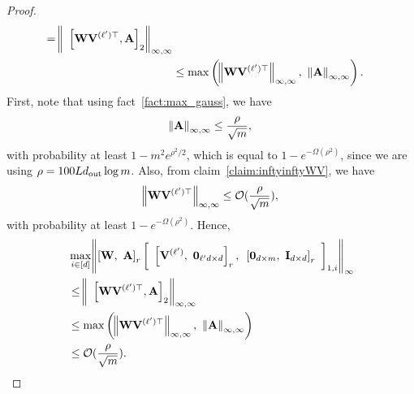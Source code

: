 \begin{proof}
\begin{align*}
		= \norm{\text{ }\left[\mathbf{W}\mathbf{V}^{(\ell')\top},  \mathbf{A}\right]_{2}}_{\infty, \infty}  \\&
		\le \max\left(\norm{\mathbf{W}\mathbf{V}^{(\ell')\top}}_{\infty, \infty}, \text{ } \norm{\mathbf{A}}_{\infty, \infty}\right).
	\end{align*}
	First, note that using fact~\ref{fact:max_gauss}, we have
	\begin{align*}
		\norm{\mathbf{A}}_{\infty, \infty} \le \frac{\rho}{\sqrt{m}},
	\end{align*}
	with probability at least $1 - m^2e^{\rho^2/2}$, which is equal to $1 - e^{-\Omega(\rho^2)}$, since we are using $\rho = 100Ld_{\mathrm{out}} \log m$. Also, from claim~\ref{claim:inftyinftyWV}, we have
	\begin{align*}
		\norm{\mathbf{W}\mathbf{V}^{(\ell')\top}}_{\infty, \infty} \le \mathcal{O}(\frac{\rho}{\sqrt{m}}),
	\end{align*}
	with probability at least $1 - e^{-\Omega(\rho^2)}$.
	Hence, 
	\begin{align*}
		&\max_{i \in [d]} \norm{\left[\mathbf{W}, \text{ } \mathbf{A}\right]_r \left[\text{ }\left[\mathbf{V}^{(\ell')}, \text{ } \mathbf{0}_{\ell'd \times d}\right]_r,\text{ } \left[\mathbf{0}_{d \times m},\text{ } \mathbf{I}_{d \times d}\right]_r\text{ }\right]_{1, i}}_{\infty}\\&
		\le \norm{\text{ }\left[\mathbf{W}\mathbf{V}^{(\ell')\top},  \mathbf{A}\right]_{2}}_{\infty, \infty}  \\&
		\le \max\left(\norm{\mathbf{W}\mathbf{V}^{(\ell')\top}}_{\infty, \infty}, \text{ } \norm{\mathbf{A}}_{\infty, \infty}\right) \\&
		\le \mathcal{O}(\frac{\rho}{\sqrt{m}}).
	\end{align*}

\end{proof}
